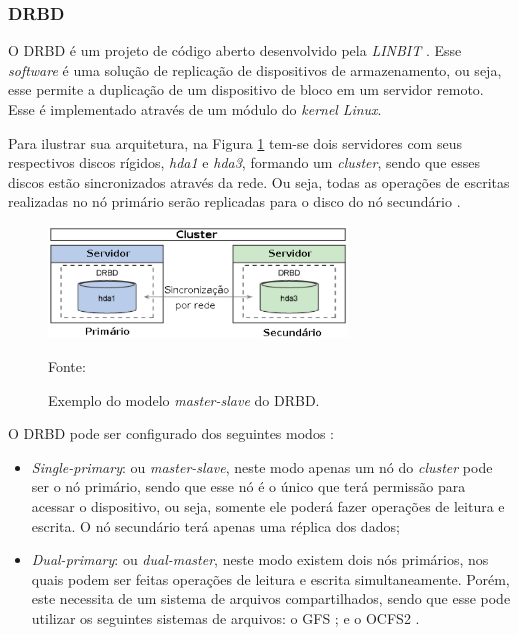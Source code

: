 
\subsubsection{DRBD}
\label{section:drbd}
O \ac{DRBD} é um projeto de código aberto desenvolvido pela \textit{LINBIT} \cite{drbd}.
Esse \textit{software} é uma solução de replicação de dispositivos de armazenamento, ou seja, esse permite a duplicação de um dispositivo de bloco 
em um servidor remoto. Esse é implementado através de um módulo do \textit{kernel} \textit{Linux}. 

Para ilustrar sua arquitetura, na Figura \ref{fig:drbd_basic} tem-se dois servidores com seus respectivos discos rígidos, \textit{hda1} e 
\textit{hda3}, formando um \textit{cluster}, sendo que esses discos estão sincronizados através da rede. Ou seja, todas as operações de escritas 
realizadas no nó primário serão replicadas para o disco do nó secundário \cite{zaminhani2008}.

\begin{figure}[h!]
 \centering
 \includegraphics[width=300px]{img/drbd_basic.eps}
 \caption{Exemplo do modelo \textit{master-slave} do \ac{DRBD}.}
 Fonte: \citet{jones2010}
 \label{fig:drbd_basic}
\end{figure}

O \ac{DRBD} pode ser configurado dos seguintes modos \cite{drbd}:
\begin{itemize}
 \item \textit{Single-primary}: ou \textit{master-slave}, neste modo apenas um nó do \textit{cluster} pode ser o nó primário, sendo que esse nó 
 é o único que terá permissão para acessar o dispositivo, ou seja, somente ele poderá fazer operações de leitura e escrita. O nó 
 secundário terá apenas uma réplica dos dados;
 \item \textit{Dual-primary}: ou \textit{dual-master}, neste modo existem dois nós primários, nos quais podem ser feitas operações de leitura e 
 escrita simultaneamente. Porém, este necessita de um sistema de arquivos compartilhados, sendo que esse pode utilizar os seguintes sistemas de
 arquivos: o \ac{GFS} \cite{gfs}; e o \ac{OCFS2} \cite{ocfs2}.
\end{itemize}

